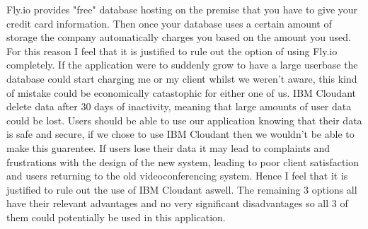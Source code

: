 Fly.io provides "free" database hosting on the premise that
you have to give your credit card information. Then once 
your database uses a certain amount of storage the company
automatically charges you based on the amount you used. For
this reason I feel that it is justified to rule out the
option of using Fly.io completely. If the application were
to suddenly grow to have a large userbase the database could
start charging me or my client whilst we weren't aware, this
kind of mistake could be economically catastophic for either 
one of us. IBM Cloudant delete data after 30 days of 
inactivity, meaning that large amounts of user data could 
be lost. Users should be able to use our application knowing
that their data is safe and secure, if we chose to use IBM
Cloudant then we wouldn't be able to make this guarentee. If
users lose their data it may lead to complaints and 
frustrations with the design of the new system, leading to 
poor client satisfaction and users returning to the old 
videoconferencing system. Hence I feel that it is justified 
to rule out the use of IBM Cloudant aswell. The remaining 3 
options all have their relevant advantages and no very
significant disadvantages so all 3 of them could potentially
be used in this application. \\ \vspace{0.2cm}


